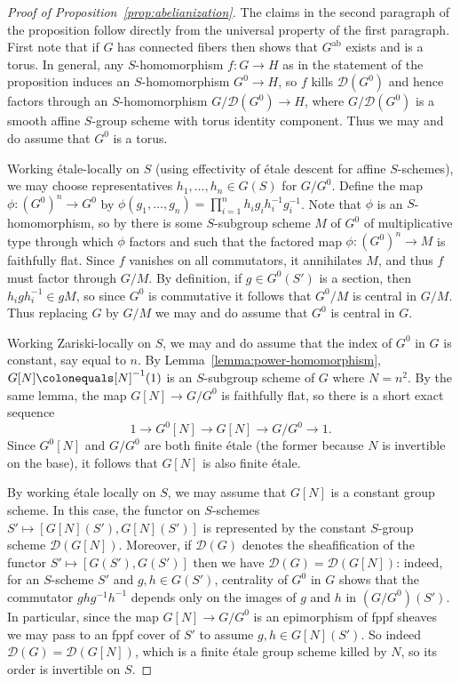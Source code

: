 \documentclass[11pt, letterpaper,english]{amsart}
\theoremstyle{plain}
\theoremstyle{definition}
\numberwithin{equation}{section}
\numberwithin{lem}{section}
\newcommand{\sD}{{\mathscr D}}
\begin{document}
\begin{proof}[Proof of Proposition~\ref{prop:abelianization}]
The claims in the second paragraph of the proposition follow directly from the universal property of the first paragraph. First note that if $G$ has connected fibers then \cite[Thm.\ 5.3.1]{conrad} shows that $G^{\mathrm{ab}}$ exists and is a torus. In general, any $S$-homomorphism $f: G \to H$ as in the statement of the proposition induces an $S$-homomorphism $G^0 \to H$, so $f$ kills $\sD(G^0)$ and hence factors through an $S$-homomorphism $G/\sD(G^0) \to H$, where $G/\sD(G^0)$ is a smooth affine $S$-group scheme with torus identity component. Thus we may and do assume that $G^0$ is a torus.  

Working \'{e}tale-locally on $S$ (using effectivity of \'{e}tale descent for affine $S$-schemes), we may choose representatives $h_1, \dots, h_n \in G(S)$ for $G/G^0$. Define the map $\phi: (G^0)^n \to G^0$ by $\phi(g_1, \dots, g_n) = \prod_{i=1}^n h_ig_ih_i^{-1}g_i^{-1}$. Note that $\phi$ is an $S$-homomorphism, so by \cite[Exp.\ IX, Thm.\ 6.8]{sga3} there is some $S$-subgroup scheme $M$ of $G^0$ of multiplicative type through which $\phi$ factors and such that the factored map $\phi: (G^0)^n \to M$ is faithfully flat. Since $f$ vanishes on all commutators, it annihilates $M$, and thus $f$ must factor through $G/M$. By definition, if $g \in G^0(S')$ is a section, then $h_igh_i^{-1} \in gM$, so since $G^0$ is commutative it follows that $G^0/M$ is central in $G/M$. Thus replacing $G$ by $G/M$ we may and do assume that $G^0$ is central in $G$.

Working Zariski-locally on $S$, we may and do assume that the index of $G^0$ in $G$ is constant, say equal to $n$. By Lemma~\ref{lemma:power-homomorphism}, $G[N] \colonequals [N]^{-1}(1)$ is an $S$-subgroup scheme of $G$ where $N = n^2$. By the same lemma, the map $G[N] \to G/G^0$ is faithfully flat, so there is a short exact sequence
\[
1 \to G^0[N] \to G[N] \to G/G^0 \to 1.
\]
Since $G^0[N]$ and $G/G^0$ are both finite \'{e}tale (the former because $N$ is invertible on the base), it follows that $G[N]$ is also finite \'{e}tale. 

By working \'{e}tale locally on $S$, we may assume that $G[N]$ is a constant group scheme. In this case, the functor on $S$-schemes $S' \mapsto [G[N](S'), G[N](S')]$ is represented by the constant $S$-group scheme $\sD(G[N])$. Moreover, if $\sD(G)$ denotes the sheafification of the functor $S' \mapsto [G(S'), G(S')]$ then we have $\sD(G) = \sD(G[N])$: indeed, for an $S$-scheme $S'$ and $g, h \in G(S')$, centrality of $G^0$ in $G$ shows that the commutator $ghg^{-1}h^{-1}$ depends only on the images of $g$ and $h$ in $(G/G^0)(S')$. In particular, since the map $G[N] \to G/G^0$ is an epimorphism of fppf sheaves we may pass to an fppf cover of $S'$ to assume $g, h \in G[N](S')$. So indeed $\sD(G) = \sD(G[N])$, which is a finite \'{e}tale group scheme killed by $N$, so its order is invertible on $S$. 


\end{proof}
\end{document}
